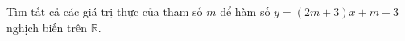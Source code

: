 \begin{ex}
Tìm tất cả các giá trị thực của tham số $m$ để hàm số $y=(2m+3)x+m+3$ nghịch biến trên $\mathbb R$.
\end{ex}
